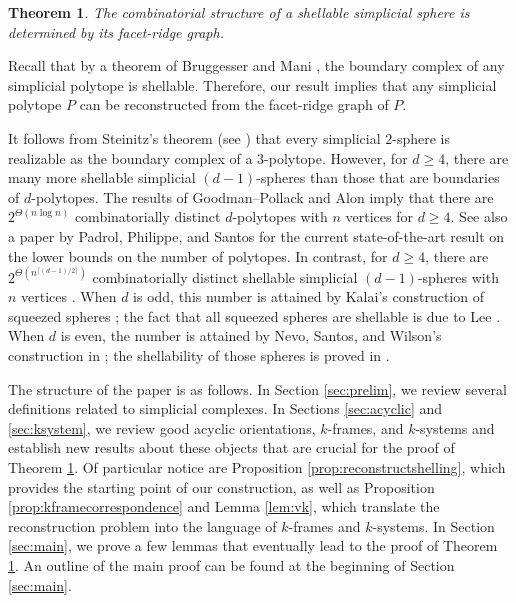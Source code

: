 \documentclass[11pt,twoside]{article}
\newtheorem{theorem}{Theorem}[section]
\theoremstyle{definition}
\begin{document}
\begin{theorem}\label{thm:main}
    The combinatorial structure of a shellable simplicial sphere is determined by its facet-ridge graph. 
\end{theorem}

Recall that by a theorem of Bruggesser and Mani \cite{Mani2}, the boundary complex of any simplicial polytope is shellable. Therefore, our result implies that any simplicial polytope $P$ can be reconstructed from the facet-ridge graph of $P$. 

It follows from Steinitz’s theorem (see \cite[Chapter 4]{Ziegler}) that every simplicial $2$-sphere is realizable as the boundary complex of a $3$-polytope. However, for $d \ge 4$, there are many more shellable simplicial $(d-1)$-spheres than those that are boundaries of $d$-polytopes. The results of Goodman--Pollack \cite{Goodman} and Alon \cite{Alon} imply that there are $2^{\Theta(n \log n)}$ combinatorially distinct $d$-polytopes with $n$ vertices for $d \ge 4$. See also a paper by Padrol, Philippe, and Santos \cite{padrol} for the current state-of-the-art result on the lower bounds on the number of polytopes. In contrast, for $d \ge 4$, there are $2^{\Theta(n^{\lceil (d-1)/2 \rceil})}$ combinatorially distinct shellable simplicial $(d-1)$-spheres with $n$ vertices \cite{Yirong}. When $d$ is odd, this number is attained by Kalai's construction of squeezed spheres \cite{Kalai2}; the fact that all squeezed spheres are shellable is due to Lee \cite{Lee}. When $d$ is even, the number is attained by Nevo, Santos, and Wilson's construction in \cite{Nevo}; the shellability of those spheres is proved in \cite{Yirong}. 

The structure of the paper is as follows. In Section \ref{sec:prelim}, we review several definitions related to simplicial complexes. In Sections \ref{sec:acyclic} and \ref{sec:ksystem}, we review good acyclic orientations,  $k$-frames, and $k$-systems and establish new results about these objects that are crucial for the proof of Theorem \ref{thm:main}. Of particular notice are Proposition \ref{prop:reconstructshelling}, which provides the starting point of our construction, as well as Proposition \ref{prop:kframecorrespondence} and Lemma \ref{lem:vk}, which translate the reconstruction problem into the language of $k$-frames and $k$-systems. In Section \ref{sec:main}, we prove a few lemmas that eventually lead to the proof of Theorem \ref{thm:main}. An outline of the main proof can be found at the beginning of Section \ref{sec:main}. 
\end{document}
